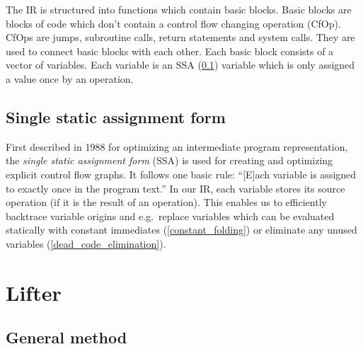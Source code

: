 \documentclass[course=eragp]{aspdoc}
\begin{document}
\par

The IR is structured into functions which contain basic blocks. Basic blocks are blocks of code
which don't contain a control flow changing operation (CfOp). CfOps are jumps, subroutine calls,
return statements and system calls. They are used to connect basic blocks with each other. Each
basic block consists of a vector of variables. Each variable is an SSA (\ref{ssa}) variable which is
only assigned a value once by an operation.

\subsection{Single static assignment form}\label{ssa}

First described in 1988 for optimizing an intermediate program representation\cite{ssa_proposal},
the \emph{single static assignment form} (SSA) is used for creating and optimizing explicit control
flow graphs. It follows one basic rule: ``[E]ach variable is 
assigned to exactly once in the program text.''\cite[p.~18]{ssa_proposal} In our IR, each variable
stores its source operation (if it is the result of an operation). This enables us to efficiently
backtrace variable origins and e.g.\ replace variables which can be evaluated statically with constant
immediates (\ref{constant_folding}) or eliminate any unused variables (\ref{dead_code_elimination}).


\section{Lifter}
\subsection{General method}

\end{document}
